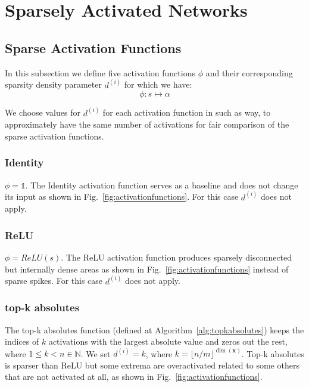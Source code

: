 \documentclass[journal]{IEEEtran}
\begin{document}
\section{Sparsely Activated Networks}\label{sec:sans}

\subsection{Sparse Activation Functions}\label{sec:safs}
In this subsection we define five activation functions $\phi$ and their corresponding sparsity density parameter $d^{(i)}$ for which we have:
\begin{equation}
  \label{eq:phi}
  \phi: s \longmapsto \alpha
\end{equation}

We choose values for $d^{(i)}$ for each activation function in such as way, to approximately have the same number of activations for fair comparison of the sparse activation functions.

\subsubsection{Identity}\label{sec:identity}
$\phi = \mathds{1}$.
The Identity activation function serves as a baseline and does not change its input as shown in Fig.~\ref{fig:activationfunctions}.
For this case $d^{(i)}$ does not apply.

\subsubsection{ReLU}\label{sec:relu}
$\phi = ReLU(s)$.
The ReLU activation function produces sparsely disconnected but internally dense areas as shown in Fig.~\ref{fig:activationfunctions} instead of sparse spikes.
For this case $d^{(i)}$ does not apply.

\subsubsection{top-k absolutes}\label{sec:topkabsolutes}
The top-k absolutes function (defined at Algorithm~\ref{alg:topkabsolutes}) keeps the indices of $k$ activations with the largest absolute value and zeros out the rest, where $1 \le k < n \in \mathbb{N}$.
We set $d^{(i)} = k$, where $k = \lfloor n/m \rfloor^{\dim(\bm{x})}$.
Top-k absolutes is sparser than ReLU but some extrema are overactivated related to some others that are not activated at all, as shown in Fig.~\ref{fig:activationfunctions}.
\end{document}
